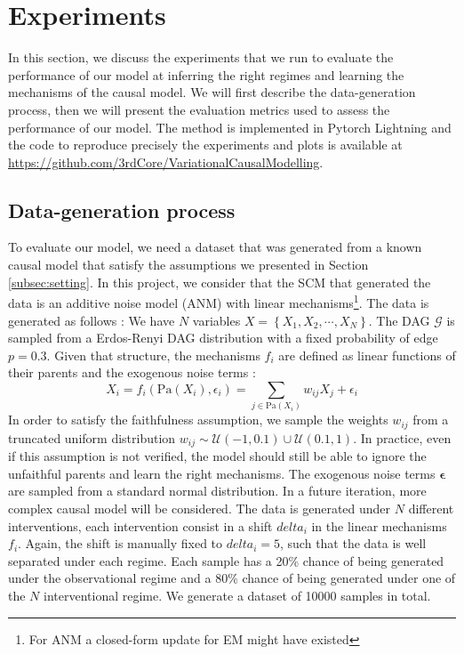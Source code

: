 \documentclass{article}
\begin{document}
\section{Experiments}\label{subsec:Experiments}
In this section, we discuss the experiments that we run to evaluate the
performance of our model at inferring the right regimes and learning the
mechanisms of the causal model. We will first describe the data-generation
process, then we will present the evaluation metrics used to assess the
performance of our model. The method is implemented in Pytorch Lightning and
the code to reproduce precisely the experiments and plots is available at
\url{https://github.com/3rdCore/VariationalCausalModelling}.

\subsection{Data-generation process}

To evaluate our model, we need a dataset that was generated from a known causal
model that satisfy the assumptions we presented in Section
\ref{subsec:setting}. In this project, we consider that the SCM that generated
the data is an additive noise model (ANM) with linear mechanisms\footnote{For
    ANM a closed-form update for EM might have existed}. The data is generated as
follows : We have $N$ variables $X = \left\{ X_1, X_2, \cdots, X_N \right\}$.
The DAG $\mathcal{G}$ is sampled from a Erdos-Renyi DAG distribution with a
fixed probability of edge $p=0.3$. Given that structure, the mechanisms $f_i$
are defined as linear functions of their parents and the exogenous noise terms
:
\begin{equation}
    X_i = f_i(\text{Pa}(X_i), \epsilon_i) =
    \sum_{j \in \text{Pa}(X_i)} w_{ij} X_j + \epsilon_i
\end{equation}
In order to satisfy the faithfulness assumption, we sample the weights $w_{ij}$ from a truncated uniform distribution $w_{ij} \sim \mathcal{U}(-1,0.1) \cup \mathcal{U}(0.1,1)$. In practice, even if this assumption is not verified, the model should still be able to ignore the unfaithful parents and learn the right mechanisms. The exogenous noise terms $\boldsymbol{\epsilon}$ are sampled from a standard normal distribution. In a future iteration, more complex causal model will be considered. The data is generated under $N$ different interventions, each intervention consist in a shift $delta_i$ in the linear mechanisms $f_i$. Again, the shift is manually fixed to $delta_i = 5$, such that the data is well separated under each regime. Each sample has a 20\% chance of being generated under the observational regime and a 80\% chance of being generated under one of the $N$ interventional regime. We generate a dataset of 10000 samples in total.
\end{document}
